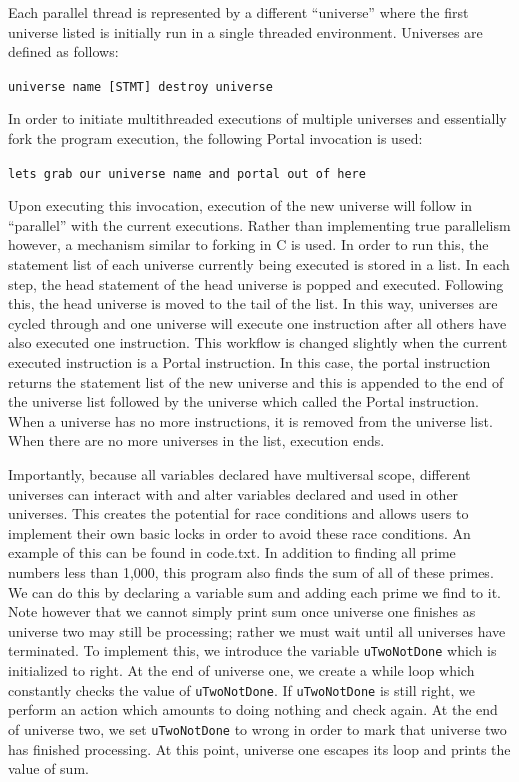 \documentclass[numbers]{sigplanconf}
\begin{document}
Each parallel thread is represented by a different “universe” where the first universe listed is initially run in a single threaded environment. Universes are defined as follows:


\texttt{universe name [STMT] destroy universe}

	
In order to initiate multithreaded executions of multiple universes and essentially fork the program execution, the following Portal invocation is used:
	

\texttt{lets grab our universe name and portal out of here}

	
Upon executing this invocation, execution of the new universe will follow in “parallel” with the current executions. Rather than implementing true parallelism however, a mechanism similar to forking in C is used. In order to run this, the statement list of each universe currently being executed is stored in a list. In each step, the head statement of the head universe is popped and executed. Following this, the head universe is moved to the tail of the list. In this way, universes are cycled through and one universe will execute one instruction after all others have also executed one instruction. This workflow is changed slightly when the current executed instruction is a Portal instruction. In this case, the portal instruction returns the statement list of the new universe and this is appended to the end of the universe list followed by the universe which called the Portal instruction. When a universe has no more instructions, it is removed from the universe list. When there are no more universes in the list, execution ends.

Importantly, because all variables declared have multiversal scope, different universes can interact with and alter variables declared and used in other universes. This creates the potential for race conditions and allows users to implement their own basic locks in order to avoid these race conditions. An example of this can be found in code.txt. In addition to finding all prime numbers less than 1,000, this program also finds the sum of all of these primes. We can do this by declaring a variable sum and adding each prime we find to it. Note however that we cannot simply print sum once universe one finishes as universe two may still be processing; rather we must wait until all universes have terminated. To implement this, we introduce the variable \texttt{uTwoNotDone} which is initialized to right. At the end of universe one, we create a while loop which constantly checks the value of \texttt{uTwoNotDone}. If \texttt{uTwoNotDone} is still right, we perform an action which amounts to doing nothing and check again. At the end of universe two, we set \texttt{uTwoNotDone} to wrong in order to mark that universe two has finished processing. At this point, universe one escapes its loop and prints the value of sum.
\end{document}
